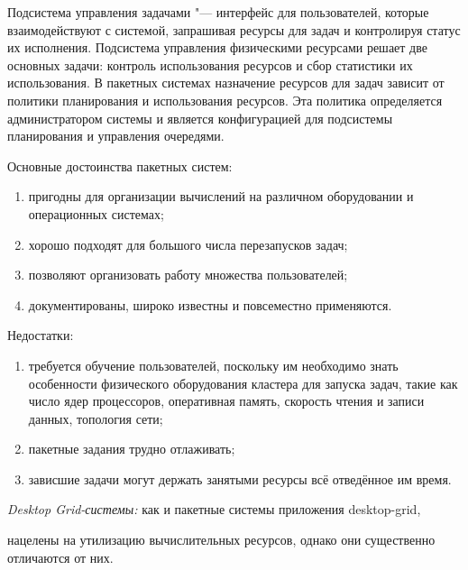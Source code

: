 Подсистема управления задачами "--- интерфейс для пользователей, которые взаимодействуют с системой, запрашивая ресурсы для задач и контролируя статус их исполнения. Подсистема управления физическими ресурсами решает две основных задачи: контроль использования ресурсов и сбор статистики их использования. В пакетных системах назначение ресурсов для задач зависит от политики планирования и использования ресурсов. Эта политика определяется администратором системы и является конфигурацией для подсистемы планирования и управления очередями. 

Основные достоинства пакетных систем:

\begin{enumerate}

\item пригодны для организации вычислений на различном оборудовании и операционных системах;

\item хорошо подходят для большого числа перезапусков задач;

\item позволяют организовать работу множества пользователей;

\item документированы, широко известны и повсеместно применяются.

\end{enumerate}

Недостатки:

\begin{enumerate}

\item требуется обучение пользователей, поскольку им необходимо знать особенности физического оборудования кластера для запуска задач, такие как число ядер процессоров, оперативная память, скорость чтения и записи данных, топология сети;

\item пакетные задания трудно отлаживать;

\item зависшие задачи могут держать занятыми ресурсы всё отведённое им время.

\end{enumerate}



\smallskip \textit{Desktop Grid-системы:} как и пакетные системы приложения desktop-grid, 

нацелены на утилизацию вычислительных ресурсов, однако они существенно отличаются от них. 

